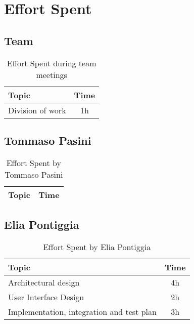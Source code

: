\chapter{Effort Spent}

\section*{Team}


\begin{table}[H]
    \renewcommand{\arraystretch}{1.5}
    \centering
    \begin{tabular}{|l|c|}
        \hline
        \textbf{Topic}   & \textbf{Time} \\ \hline
        Division of work & 1h            \\ \hline
    \end{tabular}
    \caption{Effort Spent during team meetings}
    \label{tab:group-effort-spent}
\end{table}

\section*{Tommaso Pasini}
\begin{table}[H]
    \renewcommand{\arraystretch}{1.5}
    \centering
    \begin{tabular}{|l|c|}
        \hline
        \textbf{Topic} & \textbf{Time} \\ \hline
    \end{tabular}
    \caption{Effort Spent by Tommaso Pasini}
    \label{tab:pasini-effort-spent}
\end{table}

\section*{Elia Pontiggia}
\begin{table}[H]
    \renewcommand{\arraystretch}{1.5}
    \centering
    \begin{tabular}{|l|c|}
        \hline
        \textbf{Topic}                            & \textbf{Time} \\ \hline
        Architectural design                      & 4h            \\ \hline
        User Interface Design                     & 2h            \\ \hline
        Implementation, integration and test plan & 3h            \\ \hline
    \end{tabular}
    \caption{Effort Spent by Elia Pontiggia}
    \label{tab:pontiggia-effort-spent}
\end{table}

